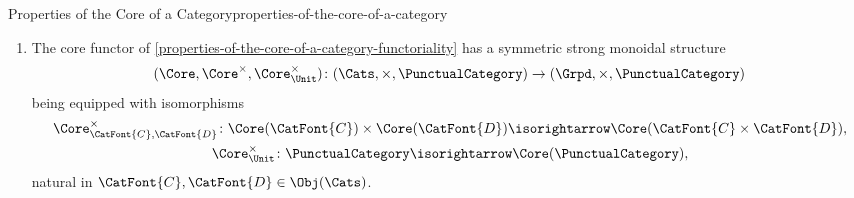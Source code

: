 \begin{proposition}{Properties of the Core of a Category}{properties-of-the-core-of-a-category}
\begin{enumerate}
            \begin{webcompile}
                \varHookTwoAdjunction#\iota#\Core#\Grpd#\Cats,#
            \end{webcompile}%
            witnessed by an isomorphism of categories
            \[
                \Fun(\CatFont{G},\CatFont{D})%
                \cong
                \Fun(\CatFont{G},\Core(\CatFont{D})),%
            \]%
            natural in $\CatFont{G}\in\Obj(\Grpd)$ and $\CatFont{D}\in\Obj(\Cats)$, forming, together with the 2-functor $\K_{0}$ of \cref{properties-of-groupoid-completion-2-functoriality} of \cref{properties-of-groupoid-completion}, a triple 2-adjunction
            \begin{webcompile}
                \HookTripleTwoAdjunction#\K_{0}#\iota#\Core#\Cats#\Grpd,#
            \end{webcompile}%
            witnessed by isomorphisms of categories
            \begin{align*}
                \Fun(\K_{0}(\CatFont{C}),\CatFont{G}) &\cong \Fun(\CatFont{C},\CatFont{G}),\\%
                \Fun(\CatFont{G},\CatFont{D})         &\cong \Fun(\CatFont{G},\Core(\CatFont{D})),%
            \end{align*}
            natural in $\CatFont{C},\CatFont{D}\in\Obj(\Cats)$ and $\CatFont{G}\in\Obj(\Grpd)$.
        \item\label{properties-of-the-core-of-a-category-symmetric-strong-monoidality-with-respect-to-products}The core functor of \cref{properties-of-the-core-of-a-category-functoriality} has a symmetric strong monoidal structure
            \[
                (\Core,\Core^{\times},\Core^{\times}_{\Unit})
                \colon
                (\Cats,\times,\PunctualCategory)
                \to
                (\Grpd,\times,\PunctualCategory)
            \]%
            being equipped with isomorphisms%
            \[
                \begin{gathered}
                    \Core^{\times}_{\CatFont{C},\CatFont{D}} \colon \Core(\CatFont{C})\times\Core(\CatFont{D}) \isorightarrow \Core(\CatFont{C}\times\CatFont{D}),\\
                    \Core^{\times}_{\Unit}                     \colon \PunctualCategory                          \isorightarrow \Core(\PunctualCategory),
                \end{gathered}
            \]%
            natural in $\CatFont{C},\CatFont{D}\in\Obj(\Cats)$.

\end{enumerate}
\end{proposition}
